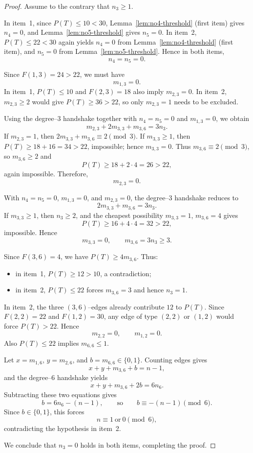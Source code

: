 \documentclass[preprint,12pt]{elsarticle}
\begin{document}
\begin{proof}
Assume to the contrary that $n_3\ge 1$.

In item~1, since $P(T)\le 10<30$, Lemma~\ref{lem:no4-threshold} (first item) gives
$n_4=0$, and Lemma~\ref{lem:no5-threshold} gives $n_5=0$.
In item~2, $P(T)\le 22<30$ again yields $n_4=0$ from
Lemma~\ref{lem:no4-threshold} (first item), and $n_5=0$ from
Lemma~\ref{lem:no5-threshold}.
Hence in both items,
\[
n_4=n_5=0.
\]

Since $F(1,3)=24>22$, we must have
\[
m_{1,3}=0.
\]
In item~1, $P(T)\le 10$ and $F(2,3)=18$ also imply $m_{2,3}=0$.
In item~2, $m_{2,3}\ge 2$ would give $P(T)\ge 36>22$, so only $m_{2,3}=1$ needs
to be excluded.

Using the degree--$3$ handshake together with $n_4=n_5=0$ and $m_{1,3}=0$, we obtain
\[
m_{2,3}+2m_{3,3}+m_{3,6}=3n_3.
\]
If $m_{2,3}=1$, then $2m_{3,3}+m_{3,6}\equiv 2\pmod 3$.
If $m_{3,3}\ge 1$, then $P(T)\ge 18+16=34>22$, impossible; hence $m_{3,3}=0$.
Thus $m_{3,6}\equiv 2\pmod 3$, so $m_{3,6}\ge 2$ and
\[
P(T)\ge 18+2\cdot 4=26>22,
\]
again impossible.
Therefore,
\[
m_{2,3}=0.
\]

With $n_4=n_5=0$, $m_{1,3}=0$, and $m_{2,3}=0$, the degree--$3$ handshake reduces to
\[
2m_{3,3}+m_{3,6}=3n_3.
\]
If $m_{3,3}\ge 1$, then $n_3\ge 2$, and the cheapest possibility
$m_{3,3}=1$, $m_{3,6}=4$ gives
\[
P(T)\ge 16+4\cdot 4=32>22,
\]
impossible. Hence
\[
m_{3,3}=0,
\qquad
m_{3,6}=3n_3\ge 3.
\]

Since $F(3,6)=4$, we have $P(T)\ge 4m_{3,6}$.
Thus:
\begin{itemize}
\item in item~1, $P(T)\ge 12>10$, a contradiction;
\item in item~2, $P(T)\le 22$ forces $m_{3,6}=3$ and hence $n_3=1$.
\end{itemize}

In item~2, the three $(3,6)$--edges already contribute $12$ to $P(T)$.
Since $F(2,2)=22$ and $F(1,2)=30$, any edge of type $(2,2)$ or $(1,2)$ would force
$P(T)>22$. Hence
\[
m_{2,2}=0,
\qquad
m_{1,2}=0.
\]
Also $P(T)\le 22$ implies $m_{6,6}\le 1$.

Let $x=m_{1,6}$, $y=m_{2,6}$, and $b=m_{6,6}\in\{0,1\}$.
Counting edges gives
\[
x+y+m_{3,6}+b=n-1,
\]
and the degree--$6$ handshake yields
\[
x+y+m_{3,6}+2b=6n_6.
\]
Subtracting these two equations gives
\[
b=6n_6-(n-1),
\qquad\text{so}\qquad
b\equiv -(n-1)\pmod 6.
\]
Since $b\in\{0,1\}$, this forces
\[
n\equiv 1 \ \text{or}\ 0 \pmod 6,
\]
contradicting the hypothesis in item~2.

We conclude that $n_3=0$ holds in both items, completing the proof.
\end{proof}
\end{document}
